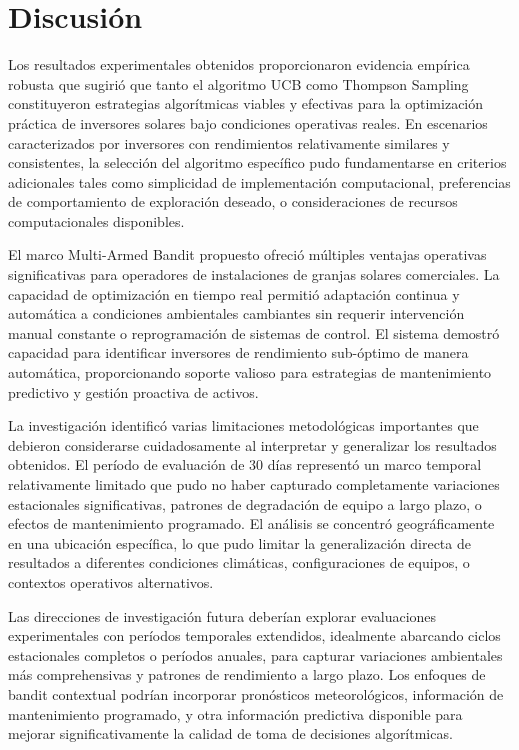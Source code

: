 \documentclass[12pt,a4paper]{article}
\begin{document}
\section{Discusión}

\justify
Los resultados experimentales obtenidos proporcionaron evidencia empírica robusta que sugirió que tanto el algoritmo UCB como Thompson Sampling constituyeron estrategias algorítmicas viables y efectivas para la optimización práctica de inversores solares bajo condiciones operativas reales. En escenarios caracterizados por inversores con rendimientos relativamente similares y consistentes, la selección del algoritmo específico pudo fundamentarse en criterios adicionales tales como simplicidad de implementación computacional, preferencias de comportamiento de exploración deseado, o consideraciones de recursos computacionales disponibles.

El marco Multi-Armed Bandit propuesto ofreció múltiples ventajas operativas significativas para operadores de instalaciones de granjas solares comerciales. La capacidad de optimización en tiempo real permitió adaptación continua y automática a condiciones ambientales cambiantes sin requerir intervención manual constante o reprogramación de sistemas de control. El sistema demostró capacidad para identificar inversores de rendimiento sub-óptimo de manera automática, proporcionando soporte valioso para estrategias de mantenimiento predictivo y gestión proactiva de activos.

La investigación identificó varias limitaciones metodológicas importantes que debieron considerarse cuidadosamente al interpretar y generalizar los resultados obtenidos. El período de evaluación de 30 días representó un marco temporal relativamente limitado que pudo no haber capturado completamente variaciones estacionales significativas, patrones de degradación de equipo a largo plazo, o efectos de mantenimiento programado. El análisis se concentró geográficamente en una ubicación específica, lo que pudo limitar la generalización directa de resultados a diferentes condiciones climáticas, configuraciones de equipos, o contextos operativos alternativos.

Las direcciones de investigación futura deberían explorar evaluaciones experimentales con períodos temporales extendidos, idealmente abarcando ciclos estacionales completos o períodos anuales, para capturar variaciones ambientales más comprehensivas y patrones de rendimiento a largo plazo. Los enfoques de bandit contextual podrían incorporar pronósticos meteorológicos, información de mantenimiento programado, y otra información predictiva disponible para mejorar significativamente la calidad de toma de decisiones algorítmicas.
\end{document}
